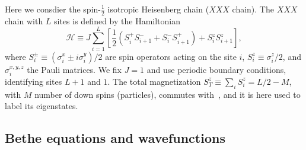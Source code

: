 \documentclass[11pt]{iopart}
\begin{document}
Here we consdier the spin-$\frac{1}{2}$ isotropic Heisenberg chain ($XXX$ chain). 
The $XXX$ chain with $L$ sites is defined by the Hamiltonian 
%
\begin{equation}
\label{xxx-ham}
{\mathcal H}\equiv J\sum\limits_{i=1}^L\left[\frac{1}{2}(S_i^+S^-_{i+1} 
+S_i^{-}S_{i+1}^+)+S_i^zS_{i+1}^z\right],  
\end{equation}
%
where $S^{\pm}_i\equiv (\sigma_i^x\pm i\sigma_i^y)/2$ are spin operators acting on the 
site $i$, $S_i^z\equiv\sigma_i^z/2$, and $\sigma^{x,y,z}_i$ the Pauli matrices. We fix 
$J=1$ and use periodic boundary conditions, identifying sites $L+1$ and $1$. The total 
magnetization $S_{T}^z\equiv\sum_iS_i^z=L/2-M$, with $M$ number of down spins (particles), 
commutes with~, and it is here used to label its eigenstates. 


\subsection{Bethe equations and wavefunctions}
\label{bethe_equations}
\end{document}
